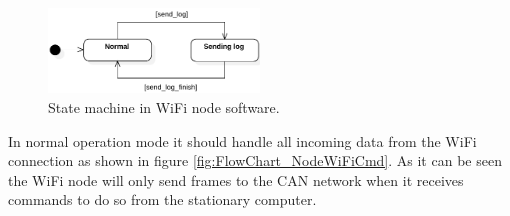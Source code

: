 \begin{figure}[!h]
\centering
\includegraphics[width=0.5\textwidth]{graphics/StateDiagram_NodeWiFiStates}
\caption{State machine in WiFi node software.}
\label{fig:StateDiagram_NodeWiFiStates}
\end{figure}

In normal operation mode it should handle all incoming data from the WiFi connection as shown in figure \ref{fig:FlowChart_NodeWiFiCmd}.
As it can be seen the WiFi node will only send frames to the CAN network when it receives commands to do so from the stationary computer.

